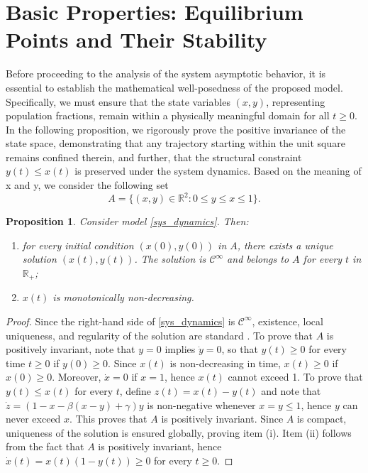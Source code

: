 \documentclass{article}
\newcommand{\R}{\mathbb R}
\newcommand{\mc}{\mathcal}
\newtheorem{proposition}[theorem]{Proposition}
\begin{document}
\section{Basic Properties: Equilibrium Points and Their Stability}\label{sec:basic}

Before proceeding to the analysis of the system asymptotic behavior, it is essential to establish the mathematical well-posedness of the proposed model. Specifically, we must ensure that the state variables $(x, y)$, representing population fractions, remain within a physically meaningful domain for all $t \ge 0$. In the following proposition, we rigorously prove the positive invariance of the state space, demonstrating that any trajectory starting within the unit square remains confined therein, and further, that the structural constraint $y(t) \le x(t)$ is preserved under the system dynamics. Based on the meaning of x and y, we consider the following set $$A = \{(x, y)\in \mathbb{R}^2 : 0 \leq y \leq x \leq 1\}.$$

\begin{proposition}\label{proposition:basic}
Consider model \eqref{sys_dynamics}. Then: 
\begin{enumerate}
    \item[(i)] for every initial condition $(x(0), y(0))$ in $A$, there exists a unique solution $(x(t), y(t))$. The solution is $\mc C^\infty$ and belongs to $A$ for every $t$ in $\R_+$;
    \item[(ii)] $x(t)$ is monotonically non-decreasing.
\end{enumerate}
\end{proposition}

\begin{proof}
Since the right-hand side of \eqref{sys_dynamics} is $\mc C^{\infty}$, existence, local uniqueness, and regularity of the solution are standard \cite[Chapter~I.3]{hale}. To prove that $A$ is positively invariant, note that $y = 0$ implies $\dot y = 0$, so that $y(t) \ge 0$ for every time $t \ge 0$ if $y(0) \ge 0$. Since $x(t)$ is non-decreasing in time, $x(t) \ge 0$ if $x(0) \ge 0$. Moreover, $\dot x = 0$ if $x = 1$, hence $x(t)$ cannot exceed 1. To prove that $y(t) \le x(t)$ for every $t$, define $z(t) = x(t) - y(t) $ and note that $\dot z = (1 - x - \beta(x - y) + \gamma)y$ is non-negative whenever $x = y \le 1$, hence $y$ can never exceed $x$. This proves that $A$ is positively invariant. Since $A$ is compact, uniqueness of the solution is ensured globally, proving item (i). Item (ii) follows from the fact that $A$ is positively invariant, hence $\dot x(t) = x(t) (1-y(t)) \ge 0$ for every $t \ge 0$.
\end{proof}
\end{document}
